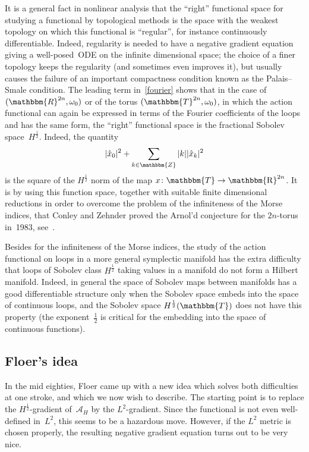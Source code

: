 \documentclass[12pt,twoside]{amsart}
\theoremstyle{plain}
\numberwithin{figure}{section}
\numberwithin{equation}{section}
\def\ca{{\mathcal A}}
\def\RR{\mathbbm{R}}
\def\TT{\mathbbm{T}}
\def\ZZ{\mathbbm{Z}}
\def\R{\operatorname{\mathbbm{R}}}
\begin{document}
It is a general fact in nonlinear analysis that the ``right'' functional space 
for studying a functional by topological methods is the space with the weakest 
topology on which this functional is ``regular'', for instance continuously differentiable. 
Indeed, regularity is needed to have a negative gradient equation giving 
a well-posed~ODE on the infinite dimensional space;
the choice of a finer topology keeps the regularity 
(and sometimes even improves it), 
but usually causes the failure of an important compactness condition known as the Palais--Smale condition. The leading term in~\eqref{fourier} shows that
in the case of $(\RR^{2n}, \omega_0)$ or of the torus $(\TT^{2n},\omega_0)$, in which the action functional can again be expressed in terms of the Fourier coefficients of the loops and has the same form, 
the ``right'' functional space is the fractional Sobolev space~$H^{\frac 12}$. Indeed, the quantity
\[
|\hat{x}_0|^2 + \sum_{k\in \ZZ} |k| |\hat{x}_k|^2
\]
is the square of the $H^{\frac 12}$ norm of the map $x \colon \TT \rightarrow \R^{2n}$. 
It is by using this function space, together with suitable finite dimensional reductions 
in order to overcome the problem of the infiniteness of the Morse indices, 
that Conley and Zehnder proved the Arnol'd conjecture for the $2n$-torus in~1983, see~\cite{CoZe83}.

Besides for the infiniteness of the Morse indices, the study of the action functional on loops 
in a more general symplectic manifold has the extra difficulty that loops of Sobolev class $H^{\frac 12}$ 
taking values in a manifold do not form a Hilbert manifold. 
Indeed, in general the space of Sobolev maps between manifolds has a good differentiable structure 
only when the Sobolev space embeds into the space of continuous loops, 
and the Sobolev space $H^{\frac 12}(\TT)$ does not have this property 
(the exponent~$\frac 12$ is critical for the embedding into the space of continuous functions).

\subsection{Floer's idea}  \label{s:idea}
In the mid eighties, Floer came up with a new idea which solves both difficulties at one stroke, 
and which we now wish to describe. The starting point is to replace the $H^{\frac 12}$-gradient of~$\ca_H$ 
by the $L^2$-gradient. Since the functional is not even well-defined in~$L^2$, 
this seems to be a hazardous move. However, if the $L^2$ metric is chosen properly, the resulting negative gradient equation turns out to be very nice. 
\end{document}
